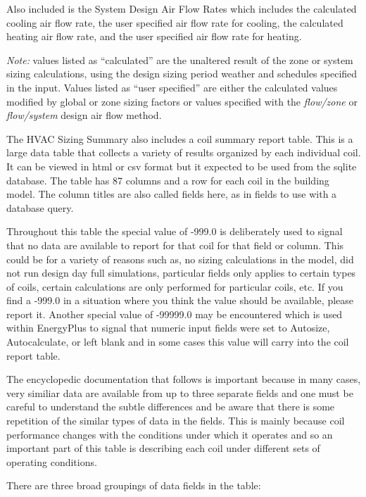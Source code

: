Also included is the System Design Air Flow Rates which includes the calculated cooling air flow rate, the user specified air flow rate for cooling, the calculated heating air flow rate, and the user specified air flow rate for heating.

\emph{Note:} values listed as ``calculated'' are the unaltered result of the zone or system sizing calculations, using the design sizing period weather and schedules specified in the input. Values listed as ``user specified'' are either the calculated values modified by global or zone sizing factors or values specified with the \emph{flow/zone} or \emph{flow/system} design air flow method.

The HVAC Sizing Summary also includes a coil summary report table. This is a large data table that collects a variety of results organized by each individual coil.  It can be viewed in html or csv format but it expected to be used from the sqlite database.  The table has 87 columns and a row for each coil in the building model.  The column titles are also called fields here, as in fields to use with a database query. 

Throughout this table the special value of -999.0 is deliberately used to signal that no data are available to report for that coil for that field or column.  This could be for a variety of reasons such as, no sizing calculations in the model, did not run design day full simulations, particular fields only applies to certain types of coils, certain calculations are only performed for particular coils, etc.  If you find a -999.0 in a situation where you think the value should be available, please report it.  Another special value of -99999.0 may be encountered which is used within EnergyPlus to signal that numeric input fields were set to Autosize, Autocalculate, or left blank and in some cases this value will carry into the coil report table.

The encyclopedic documentation that follows is important because in many cases, very similiar data are available from up to three separate fields and one must be careful to understand the subtle differences and be aware that there is some repetition of the similar types of data in the fields.  This is mainly because coil performance changes with the conditions under which it operates and so an important part of this table is describing each coil under different sets of operating conditions.

There are three broad groupings of data fields in the table:

